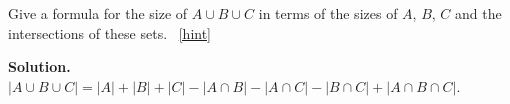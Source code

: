 \documentclass{book}
\begin{document}
\setcounter{project}{219}
\addtocounter{project}{-1}
\begin{activity}[]\label{threesetintersection}
\hypertarget{p-1240}{}%
Give a formula for the size of \(A\cup B\cup C\) in terms of the sizes of \(A\), \(B\), \(C\) and the intersections of these sets.%
~\hfill{\tiny\hyperlink{a-219}{[hint]}\hypertarget{q-219}{}}\par\smallskip%
\noindent\textbf{Solution.}\hypertarget{solution-151}{}\quad%
\hypertarget{p-1242}{}%
\(|A\cup B\cup C|=|A|+|B|+|C|-|A\cap B|- |A\cap C| - |B\cap
C| +|A\cap B\cap C|\).%
\end{activity}
\end{document}
